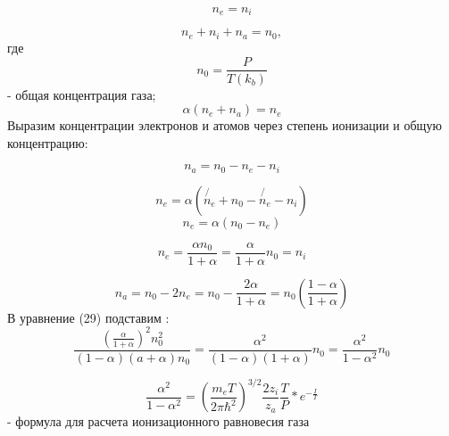\documentclass[letterpaper,12pt]{article} %
\begin{document}
\begin{equation} \label{eq:aperp} %
n_e = n_i
\end{equation}

\begin{equation} \label{eq:aperp} %
n_e + n_i + n_a = n_0,
\end{equation}
где
\begin{equation} \label{eq:aperp} %
n_0=\frac{P}{T(k_b)}
\end{equation}
- общая концентрация газа;
\begin{equation} \label{eq:aperp} %
\alpha(n_e+n_a)=n_e
\end{equation}
Выразим концентрации электронов и атомов через степень ионизации и общую концентрацию:

\begin{equation} \label{eq:aperp} %
n_a=n_0-n_e-n_i
\end{equation}

\begin{equation} \label{eq:aperp} %
n_e =\alpha(\not{n_e} + n_0 - \not{n_e} - n_i)
\end{equation}
\begin{equation} \label{eq:aperp} %
n_e = \alpha(n_0 - n_e)
\end{equation}

\begin{equation} \label{eq:aperp} %
n_e = \frac{\alpha n_0}{1+ \alpha} = \frac{\alpha}{1+\alpha}n_0=n_i
\end{equation}

\begin{equation} \label{eq:aperp} %
n_a = n_0 - 2n_e = n_0 - \frac{2 \alpha}{1+ \alpha}=n_0(\frac{1 - \alpha}{1 + \alpha })
\end{equation}
В уравнение (29) подставим :
\begin{equation} \label{eq:aperp} %
\frac{(\frac{\alpha}{1+\alpha})^2n_0^2}{(1-\alpha)(a+\alpha)n_0}=\frac{\alpha^2}{(1-\alpha)(1+\alpha)}n_0=\frac{\alpha^2}{1-\alpha^2}n_0
\end{equation}

\begin{equation} \label{eq:aperp} %
\frac{\alpha^2}{1-\alpha^2}=(\frac{m_e T}{2 \pi \hbar^2})^{3/2}\frac{2 z_i}{z_a}\frac{T}{P}*e^{-\frac{I}{T}}
\end{equation}
- формула для расчета ионизационного равновесия газа
\end{document}
